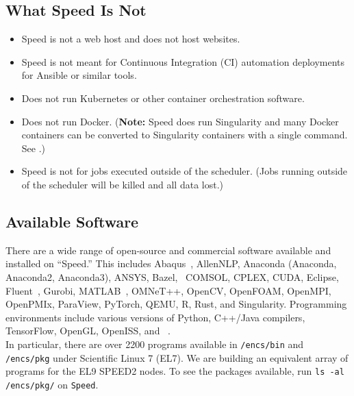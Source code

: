 \documentclass{easychair}
\begin{document}
\subsection{What Speed Is Not}
\label{sect:speed-is-not}

\begin{itemize}
	\item Speed is not a web host and does not host websites.
	\item Speed is not meant for Continuous Integration (CI) automation deployments for Ansible or similar tools. 
	\item Does not run Kubernetes or other container orchestration software.
	\item Does not run Docker. (\textbf{Note:} Speed does run Singularity and many Docker containers can be converted to Singularity 
	containers with a single command. See .)
	\item Speed is not for jobs executed outside of the scheduler. (Jobs running outside of the scheduler will be killed and all data lost.)
\end{itemize}

\subsection{Available Software}
\label{sect:available-software}

There are a wide range of open-source and commercial software available and installed on ``Speed.'' 
This includes Abaqus~\cite{abaqus}, AllenNLP, Anaconda (Anaconda, Anaconda2, Anaconda3), ANSYS, Bazel, \
COMSOL, CPLEX, CUDA, Eclipse, Fluent~\cite{fluent}, Gurobi, MATLAB~\cite{matlab,scholarpedia-matlab}, 
OMNeT++, OpenCV, OpenFOAM, OpenMPI, OpenPMIx, ParaView, PyTorch, QEMU, R, Rust, and Singularity.
Programming environments include various versions of Python, C++/Java compilers, TensorFlow, OpenGL, OpenISS, and {\marf}~\cite{marf}.\\

In particular, there are over 2200 programs available in \texttt{/encs/bin} and \texttt{/encs/pkg} under Scientific Linux 7 (EL7).
We are building an equivalent array of programs for the EL9 SPEED2 nodes. To see the packages available, run \texttt{ls -al /encs/pkg/} on \texttt{Speed}. 
\end{document}
